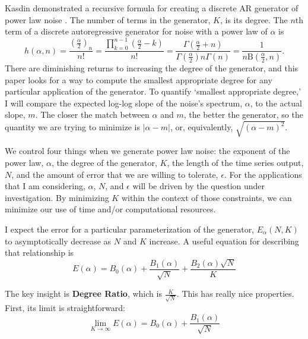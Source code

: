 \documentclass[preprint]{JASA}
\begin{document}
Kasdin demonstrated a recursive formula for creating a discrete AR generator of power law noise \citep{kasdin_walter:1992}.
The number of terms in the generator, $K$, is its degree.
The $n$th term of a discrete autoregressive generator for noise with a power law of $\alpha$ is
\begin{equation}
  \label{iterative_term}
  h\left(\alpha, n\right) =
  \frac{{\left(\frac{\alpha}{2}\right)}_n}{n!} =
  \frac{\prod_{k=0}^{n-1}{(\frac{\alpha}{2}-k)}}{n!} =
  \frac{\Gamma\left(\frac{\alpha}{2}+n\right)}{\Gamma\left(\frac{\alpha}{2}\right)n\Gamma\left(n\right)} =
  \frac{1}{n\mathrm{B}\left(\frac{\alpha}{2},n\right)}.
\end{equation}
There are diminishing returns to increasing the degree of the generator, and this paper looks for a way to compute the smallest appropriate degree for any particular application of the generator.
To quantify `smallest appropriate degree,' I will compare the expected log-log slope of the noise's spectrum, $\alpha$, to the actual slope, $m$.
The closer the match between $\alpha$ and $m$, the better the generator, so the quantity we are trying to minimize is $\left|\alpha - m\right|$, or, equivalently, $\sqrt{\left(\alpha - m\right)^2}$.

We control four things when we generate power law noise: the exponent of the power law, $\alpha$, the degree of the generator, $K$, the length of the time series output, $N$, and the amount of error that we are willing to tolerate, $\epsilon$.
For the applications that I am considering, $\alpha$, $N$, and $\epsilon$ will be driven by the question under investigation.
By minimizing $K$ within the context of those constraints, we can minimize our use of time and/or computational resources.

I expect the error for a particular parameterization of the generator, $E_{\alpha}(N, K)$ to asymptotically decrease as $N$ and $K$ increase.
A useful equation for describing that relationship is
\begin{equation}
  \label{error_fit}
  E(\alpha) = B_0(\alpha)
  + \frac{B_1(\alpha)}{\sqrt{N}}
  + \frac{B_2(\alpha)\sqrt{N}}{K}
\end{equation}

The key insight is \textbf{Degree Ratio}, which is $\frac{K}{\sqrt{N}}$.
This has really nice properties.
First, its limit is straightforward:
\begin{equation}
  \lim_{K \to \infty}{E(\alpha)} = B_0(\alpha) + \frac{B_1(\alpha)}{\sqrt{N}}
\end{equation}
\end{document}
